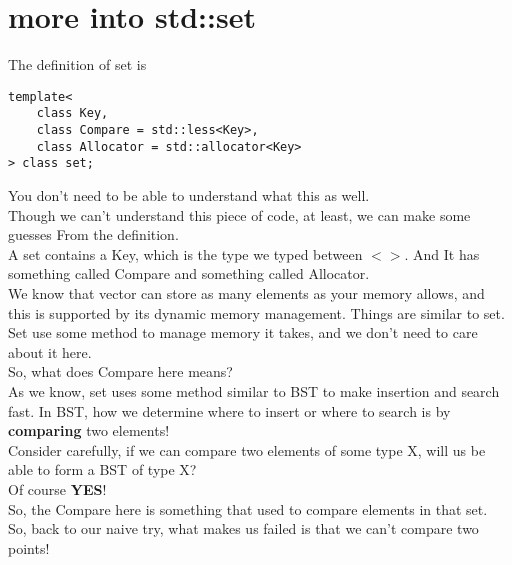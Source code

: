 \documentclass{article}
\begin{document}
\section{more into std::set}
The definition of set is
\begin{lstlisting}
template<
    class Key,
    class Compare = std::less<Key>,
    class Allocator = std::allocator<Key>
> class set; 
\end{lstlisting}
You don't need to be able to understand what this as well.\\
Though we can't understand this piece of code, at least, we can make some guesses From the definition.\\
A set contains a Key, which is the type we typed between $<>$. And It has something called Compare and something called Allocator.\\
We know that vector can store as many elements as your memory allows, and this is supported by its dynamic memory management. Things are similar to set. Set use some method to manage memory it takes, and we don't need to care about it here.\\
So, what does Compare here means?\\
As we know, set uses some method similar to BST to make insertion and search fast. In BST, how we determine where to insert or where to search is by \textbf{comparing} two elements!\\
Consider carefully, if we can compare two elements of some type X, will us be able to form a BST of type X?\\
Of course \textbf{YES}!\\
So, the Compare here is something that used to compare elements in that set.\\
So, back to our naive try, what makes us failed is that we can't compare two points!
\newpage
\end{document}
